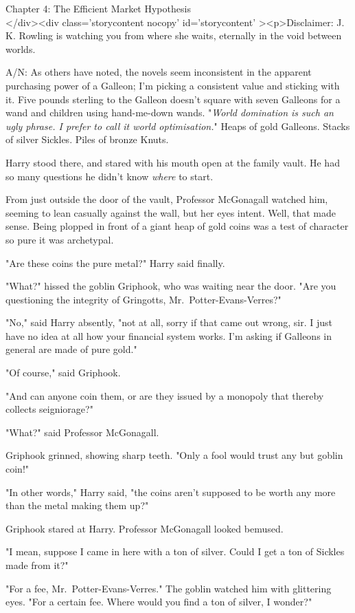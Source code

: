 
Chapter 4: The Efficient Market Hypothesis\\
</div><div  class='storycontent nocopy' id='storycontent' ><p>Disclaimer: J. K. Rowling is watching you from where she waits, eternally in the void between worlds.

A/N: As others have noted, the novels seem inconsistent in the apparent purchasing power of a Galleon; I'm picking a consistent value and sticking with it. Five pounds sterling to the Galleon doesn't square with seven Galleons for a wand and children using hand-me-down wands.
\sbreak
"\emph{World domination is such an ugly phrase. I prefer to call it world optimisation.}"
\sbreak
Heaps of gold Galleons. Stacks of silver Sickles. Piles of bronze Knuts.

Harry stood there, and stared with his mouth open at the family vault. He had so many questions he didn't know \emph{where} to start.

From just outside the door of the vault, Professor McGonagall watched him, seeming to lean casually against the wall, but her eyes intent. Well, that made sense. Being plopped in front of a giant heap of gold coins was a test of character so pure it was archetypal.

"Are these coins the pure metal?" Harry said finally.

"What?" hissed the goblin Griphook, who was waiting near the door. "Are you questioning the integrity of Gringotts, Mr.~Potter-Evans-Verres?"

"No," said Harry absently, "not at all, sorry if that came out wrong, sir. I just have no idea at all how your financial system works. I'm asking if Galleons in general are made of pure gold."

"Of course," said Griphook.

"And can anyone coin them, or are they issued by a monopoly that thereby collects seigniorage?"

"What?" said Professor McGonagall.

Griphook grinned, showing sharp teeth. "Only a fool would trust any but goblin coin!"

"In other words," Harry said, "the coins aren't supposed to be worth any more than the metal making them up?"

Griphook stared at Harry. Professor McGonagall looked bemused.

"I mean, suppose I came in here with a ton of silver. Could I get a ton of Sickles made from it?"

"For a fee, Mr.~Potter-Evans-Verres." The goblin watched him with glittering eyes. "For a certain fee. Where would you find a ton of silver, I wonder?"


